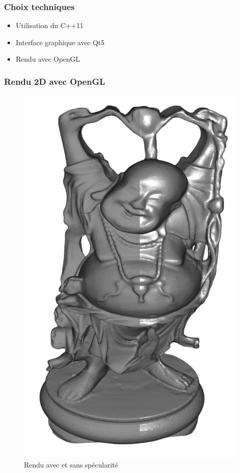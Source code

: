 \documentclass{beamer}
\begin{document}


\begin{frame}
\frametitle{Choix techniques}
\begin{itemize}[label=$\bullet$]
	\item Utilisation du C++11
	\item Interface graphique avec Qt5
	\item Rendu avec OpenGL
\end{itemize}

\end{frame}


\begin{frame}
\frametitle{Rendu 2D avec OpenGL}
\begin{figure}
\centering
\includegraphics[scale=0.15]{rendu_specular.png}
\caption{Rendu avec et sans spécularité}
\end{figure}

\end{frame}
\end{document}
